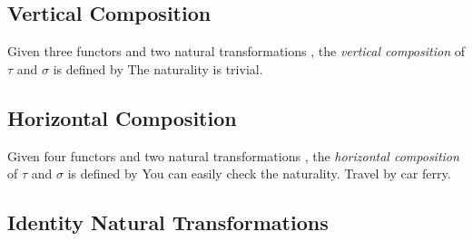 \subsection{Vertical Composition}

Given three functors
and two natural transformations
, the \textit{vertical composition} of $\tau$ and $\sigma$
is defined by
The naturality is trivial.

\subsection{Horizontal Composition}

Given four functors
and two natural transformations
, the \textit{horizontal composition} of $\tau$ and $\sigma$
is defined by
You can easily check the naturality. Travel by car ferry.


\subsection{Identity Natural Transformations}

